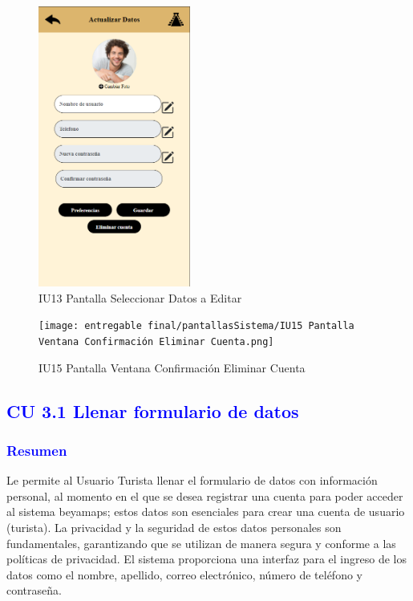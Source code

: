 \begin{figure}[htbp]
        \centering
        \includegraphics[width= 5cm]{entregable final/pantallasSistema/IU13 Pantalla Seleccionar Datos a Editar.png}
        \caption{IU13 Pantalla Seleccionar Datos a Editar}
        \label{fig:enter-label}
\end{figure}

\begin{figure}[htbp]
        \centering
        \texttt{[image: entregable final/pantallasSistema/IU15 Pantalla Ventana Confirmación Eliminar Cuenta.png]}
        \caption{IU15 Pantalla Ventana Confirmación Eliminar Cuenta}
        \label{fig:enter-label}
        \vspace{200pt}
\end{figure}
\newpage



\subsection{\textcolor{blue}{CU 3.1 Llenar formulario de datos}}
\subsubsection{\textcolor{blue}{Resumen}}
             Le permite al Usuario Turista llenar el formulario de datos con información personal, al momento en el que se desea registrar una cuenta para poder acceder al sistema beyamaps; estos datos son esenciales para crear una cuenta de usuario (turista). La privacidad y la seguridad de estos datos personales son fundamentales, garantizando que se utilizan de manera segura y conforme a las políticas de privacidad. El sistema proporciona una interfaz para el ingreso de los datos como el nombre, apellido, correo electrónico, número de teléfono y contraseña.
             
